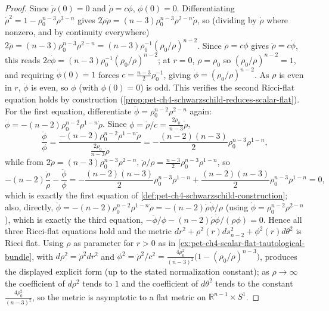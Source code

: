 \begin{proof}
  Since $\dot\rho(0)=0$ and $\dot\rho=c\phi$, $\phi(0)=0$. Differentiating
  $\dot\rho^2=1-\rho_0^{n-3}\rho^{3-n}$ gives
  $2\dot\rho\ddot\rho=(n-3)\rho_0^{n-3}\rho^{2-n}\dot\rho$, so (dividing by
  $\dot\rho$ where nonzero, and by continuity everywhere)
  $2\ddot\rho=(n-3)\rho_0^{n-3}\rho^{2-n}=(n-3)\rho_0^{-1}(\rho_0/\rho)^{n-2}$.
  Since $\dot\rho=c\phi$ gives $\ddot\rho=c\dot\phi$, this reads
  $2c\dot\phi=(n-3)\rho_0^{-1}(\rho_0/\rho)^{n-2}$; at $r=0$, $\rho=\rho_0$ so
  $(\rho_0/\rho)^{n-2}=1$, and requiring $\dot\phi(0)=1$ forces
  $c=\tfrac{n-3}2\rho_0^{-1}$, giving $\dot\phi=(\rho_0/\rho)^{n-2}$. As $\rho$
  is even in $r$, $\dot\phi$ is even, so $\phi$ (with $\phi(0)=0$) is odd. This
  verifies the second Ricci-flat equation holds by construction
  (\cref{prop:pet-ch4-schwarzschild-reduces-scalar-flat}). For the first
  equation, differentiate $\dot\phi=\rho_0^{n-2}\rho^{2-n}$ again:
  $\ddot\phi=-(n-2)\rho_0^{n-2}\rho^{1-n}\dot\rho$. Since
  $\phi=\dot\rho/c=\tfrac{2\rho_0}{n-3}\dot\rho$,
  \[
    \frac{\ddot\phi}\phi=\frac{-(n-2)\rho_0^{n-2}\rho^{1-n}\dot\rho}{\tfrac{2\rho_0}{n-3}\dot\rho}
    =-\frac{(n-2)(n-3)}2\rho_0^{n-3}\rho^{1-n},
  \]
  while from $2\ddot\rho=(n-3)\rho_0^{n-3}\rho^{2-n}$,
  $\ddot\rho/\rho=\tfrac{n-3}2\rho_0^{n-3}\rho^{1-n}$, so
  \[
    -(n-2)\frac{\ddot\rho}\rho-\frac{\ddot\phi}\phi
    =-\frac{(n-2)(n-3)}2\rho_0^{n-3}\rho^{1-n}+\frac{(n-2)(n-3)}2\rho_0^{n-3}\rho^{1-n}=0,
  \]
  which is exactly the first equation of
  \cref{def:pet-ch4-schwarzschild-construction}; also, directly,
  $\ddot\phi=-(n-2)\rho_0^{n-2}\rho^{1-n}\dot\rho=-(n-2)\dot\rho\dot\phi/\rho$
  (using $\dot\phi=\rho_0^{n-2}\rho^{2-n}$), which is exactly the third
  equation, $-\ddot\phi/\phi-(n-2)\dot\rho\dot\phi/(\rho\phi)=0$. Hence all
  three Ricci-flat equations hold and the metric
  $dr^2+\rho^2(r)ds_{n-2}^2+\phi^2(r)d\theta^2$ is Ricci flat. Using $\rho$ as
  parameter for $r>0$ as in \cref{ex:pet-ch4-scalar-flat-tautological-bundle},
  with $d\rho^2=\dot\rho^2dr^2$ and
  $\phi^2=\dot\rho^2/c^2=\tfrac{4\rho_0^2}{(n-3)^2}\big(1-(\rho_0/\rho)^{n-3}\big)$,
  produces the displayed explicit form (up to the stated normalization
  constant); as $\rho\to\infty$ the coefficient of $d\rho^2$ tends to $1$ and
  the coefficient of $d\theta^2$ tends to the constant
  $\tfrac{4\rho_0^2}{(n-3)^2}$, so the metric is asymptotic to a flat metric on
  $\mathbb{R}^{n-1}\times S^1$.
\end{proof}


